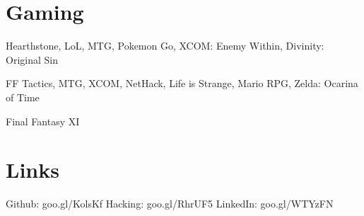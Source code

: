 \documentclass[margin,line]{resume}
\begin{document}
\begin{resume}

\section{Gaming}
\begin{description}[topsep=0pt,partopsep=0pt,itemsep=0pt,leftmargin=!,labelwidth=\widthof{\bfseries Most Play}]
    \small\item[Active    ] Hearthstone, LoL, MTG, Pokemon Go, XCOM: Enemy Within, Divinity: Original Sin
    \small\item[Favorite  ] FF Tactics, MTG, XCOM, NetHack, Life is Strange, Mario RPG, Zelda: Ocarina of Time
    \small\item[Most Play ] Final Fantasy XI
\end{description}


\section{Links}
\small Github: goo.gl/KolsKf \hfill \small Hacking: goo.gl/RhrUF5 \hfill \small LinkedIn: goo.gl/WTYzFN

\end{resume}
\end{document}
